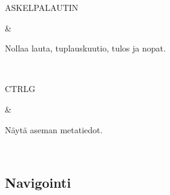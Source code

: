 \documentclass[letterpaper,10pt,finnish]{sphinxmanual}
\begin{document}
\begin{savenotes}
\begin{tabular}[t]{}
\begin{varwidth}[t]{}
\sphinxAtStartPar
ASKELPALAUTIN
\sphinxbeforeendvarwidth
\end{varwidth}%
&\begin{varwidth}[t]{}
\sphinxAtStartPar
Nollaa lauta, tuplauskuutio, tulos ja nopat.
\sphinxbeforeendvarwidth
\end{varwidth}%
\\
\sphinxhline\begin{varwidth}[t]{}
\sphinxAtStartPar
CTRL\sphinxhyphen{}G
\sphinxbeforeendvarwidth
\end{varwidth}%
&\begin{varwidth}[t]{}
\sphinxAtStartPar
Näytä aseman metatiedot.
\sphinxbeforeendvarwidth
\end{varwidth}%
\\
\sphinxbottomrule
\end{tabular}
\sphinxtableafterendhook\par
\sphinxattableend\end{savenotes}


\subsection{Navigointi}
\label{\detokenize{raccourcis:navigation}}\label{\detokenize{raccourcis:raccourcis-navigation}}
\end{document}
